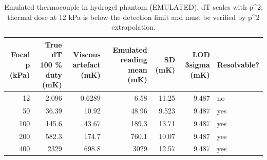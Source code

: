\begin{table}
\caption{Emulated thermocouple in hydrogel phantom (EMULATED). dT scales with p^2; thermal dose at 12 kPa is below the detection limit and must be verified by p^2 extrapolation.}
\label{tab:T_E4_thermocouple}
\begin{tabular}{rrrrrrl}
\toprule
Focal p (kPa) & True dT 100 \% duty (mK) & Viscous artefact (mK) & Emulated reading mean (mK) & SD (mK) & LOD 3sigma (mK) & Resolvable? \\
\midrule
12 & 2.096 & 0.6289 & 6.58 & 11.25 & 9.487 & no \\
50 & 36.39 & 10.92 & 48.96 & 9.523 & 9.487 & yes \\
100 & 145.6 & 43.67 & 189.3 & 13.71 & 9.487 & yes \\
200 & 582.3 & 174.7 & 760.1 & 10.07 & 9.487 & yes \\
400 & 2329 & 698.8 & 3029 & 12.57 & 9.487 & yes \\
\bottomrule
\end{tabular}
\end{table}
